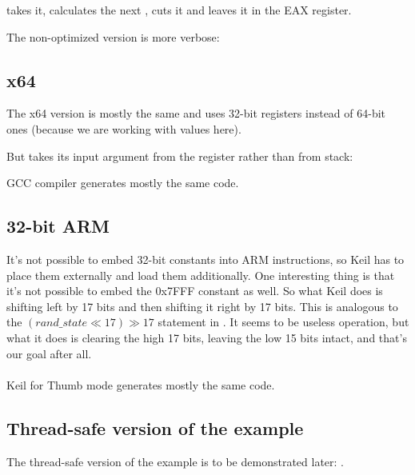  takes it, calculates the next , cuts it and leaves it in the EAX register.

The non-optimized version is more verbose:



\subsection{x64}

The x64 version is mostly the same and uses 32-bit registers instead of 64-bit ones 
(because we are working with \Tint values here).

But  takes its input argument from the \ECX register rather than from stack:



GCC compiler generates mostly the same code.

\subsection{32-bit ARM}



It's not possible to embed 32-bit constants into ARM instructions, so Keil has to place them externally and load them additionally.
One interesting thing is that it's not possible to embed the 0x7FFF constant as well.
So what Keil does is shifting  left by 17 bits and then shifting it right by 17 bits.
This is analogous to the $(rand\_state \ll 17) \gg 17$ statement in \CCpp.
It seems to be useless operation, but what it does is clearing the high 17 bits, leaving the low 15 bits intact, and that's our goal after all. \\
\\
\Optimizing Keil for Thumb mode generates mostly the same code.



\subsection{Thread-safe version of the example}

The thread-safe version of the example is to be demonstrated later: .
